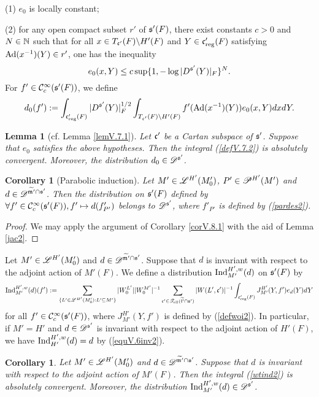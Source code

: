 \documentclass[a4paper]{amsart}
\newcommand{\fm}{{\mathfrak{m}}} \newcommand{\fn}{{\mathfrak{n}}}\newcommand{\fo}{{\mathfrak{o}}} \newcommand{\fp}{{\mathfrak{p}}}
\newcommand{\wt}{\widetilde}                        \newcommand{\wh}{\widehat}                      \newcommand{\wpair}[1]{\left\{{#1}\right\}}
\newtheorem{coro}[thm]{Corollary}
\newtheorem{lem}[thm]{Lemma}
\theoremstyle{definition}
\theoremstyle{remark}
\numberwithin{equation}{subsection}
\begin{document}
(1) $e_0$ is locally constant; 

(2) for any open compact subset $r'$ of ${\mathfrak{s}}'(F)$, there exist constants $c>0$ and $N\in{\mathbb {N}}$ such that for all $x\in T_{{\mathfrak{c}}'}(F)\backslash H'(F)$ and $Y\in{\mathfrak{c}}'_{\mathrm{reg}}(F)$ satisfying ${\mathrm{Ad}}(x^{-1})(Y)\in r'$, one has the inequality
$$ e_0(x, Y)\leq c\sup\{1, -\log |D^{{\mathfrak{s}}'}(Y)|_F\}^N. $$
For $f'\in{\mathcal {C}}_c^\infty({\mathfrak{s}}'(F))$, we define
\begin{equation}\label{defV.7.2}
 d_0(f'):=\int_{{\mathfrak{c}}'_{\mathrm{reg}}(F)} |D^{{\mathfrak{s}}'}(Y)|_F^{1/2} \int_{T_{{\mathfrak{c}}'}(F)\backslash H'(F)} f'({\mathrm{Ad}}(x^{-1})(Y)) e_0(x, Y) dx dY. 
\end{equation}

\begin{lem}[cf. Lemma \ref{lemV.7.1}]\label{lemV.7.2}
Let ${\mathfrak{c}}'$ be a Cartan subspace of ${\mathfrak{s}}'$. Suppose that $e_0$ satisfies  the above hypotheses. Then the integral (\ref{defV.7.2}) is absolutely convergent. Moreover, the distribution $d_0\in\mathscr{D}^{{\mathfrak{s}}'}$. 
\end{lem}

\begin{coro}[Parabolic induction]\label{corV.8.2}
Let $M'\in\mathscr{L}^{H'}(M'_0)$, $P'\in\mathscr{P}^{H'}(M')$ and $d\in\msd^{\wt{\fm'}\cap\fs'}$. Then the distribution on ${\mathfrak{s}}'(F)$ defined by $\forall f'\in{\mathcal {C}}_c^\infty({\mathfrak{s}}'(F)), f'\mapsto d(f'_{P'})$ belongs to $\mathscr{D}^{{\mathfrak{s}}'}$, where $f'_{P'}$ is defined by (\ref{pardes2}). 
\end{coro}

\begin{proof}
We may apply the argument of Corollary \ref{corV.8.1} with the aid of Lemma \ref{jac2}. 
\end{proof}

Let $M'\in\mathscr{L}^{H'}(M'_0)$ and $d\in\msd^{\wt{\fm'}\cap\fs'}$. Suppose that $d$ is invariant with respect to the adjoint action of $M'(F)$. We define a distribution ${\mathrm{Ind}}_{M'}^{H', w}(d)$ on ${\mathfrak{s}}'(F)$ by
\begin{equation}\label{wtind2}
 \Ind_{M'}^{H', w}(d)(f'):=\sum_{\{L'\in\msl^{H'}(M'_0): L'\subseteq M'\}} |W_0^{L'}||W_0^{M'}|^{-1} \sum_{\fc'\in\mst_\el(\wt{\fl'}\cap\fs')} |W(L', \fc')|^{-1} \int_{\fc'_\reg(F)} J_{M'}^{H'}(Y, f') e_d(Y) dY
\end{equation}
for all $f'\in{\mathcal {C}}_c^\infty({\mathfrak{s}}'(F))$, where $J_{M'}^{H'}(Y, f')$ is defined by (\ref{defwoi2}). In particular, if $M'=H'$ and $d\in\mathscr{D}^{{\mathfrak{s}}'}$ is invariant with respect to the adjoint action of $H'(F)$, we have ${\mathrm{Ind}}_{H'}^{H', w}(d)=d$ by (\ref{equV.6inv2}). 

\begin{coro}\label{corV.9.2}
Let $M'\in\mathscr{L}^{H'}(M'_0)$ and $d\in\msd^{\wt{\fm'}\cap\fs'}$. Suppose that $d$ is invariant with respect to the adjoint action of $M'(F)$. Then the integral (\ref{wtind2}) is absolutely convergent. Moreover, the distribution ${\mathrm{Ind}}_{M'}^{H', w}(d)\in\mathscr{D}^{{\mathfrak{s}}'}$. 
\end{coro}
\end{document}
